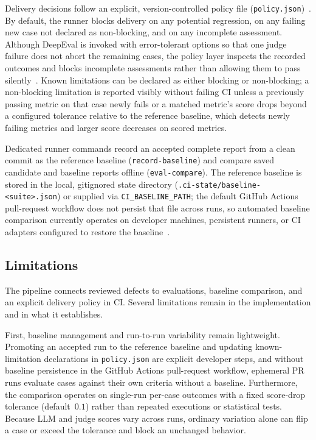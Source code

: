 Delivery decisions follow an explicit, version-controlled policy file
(\texttt{policy.json})~\parencite{Divination:Evaluations}. By default, the
runner blocks delivery on any potential regression, on any failing new case not
declared as non-blocking, and on any incomplete assessment. Although DeepEval
is invoked with error-tolerant options so that one judge failure does not abort
the remaining cases, the policy layer inspects the recorded outcomes and blocks
incomplete assessments rather than allowing them to pass
silently~\parencite{Divination:CI}. Known limitations can be declared as either
blocking or non-blocking; a non-blocking limitation is reported visibly without
failing CI unless a previously passing metric on that case newly fails or a
matched metric's score drops beyond a configured tolerance relative to the
reference baseline, which detects newly failing metrics and larger score
decreases on scored metrics.

Dedicated runner commands record an accepted complete report from a clean
commit as the reference baseline (\texttt{record-baseline}) and compare saved
candidate and baseline reports offline (\texttt{eval-compare}). The reference
baseline is stored in the local, gitignored state directory
(\texttt{.ci-state/baseline-\textless suite\textgreater.json}) or supplied via
\texttt{CI\_BASELINE\_PATH}; the default GitHub Actions pull-request workflow
does not persist that file across runs, so automated baseline comparison
currently operates on developer machines, persistent runners, or CI adapters
configured to restore the baseline~\parencite{Divination:CI}.

\subsection{Limitations}

The pipeline connects reviewed defects to evaluations, baseline comparison, and
an explicit delivery policy in CI. Several limitations remain in the
implementation and in what it establishes.

First, baseline management and run-to-run variability remain lightweight.
Promoting an accepted run to the reference baseline and updating
known-limitation declarations in \texttt{policy.json} are explicit developer
steps, and without baseline persistence in the GitHub Actions pull-request
workflow, ephemeral PR runs evaluate cases against their own criteria without a
baseline. Furthermore, the comparison operates on single-run per-case outcomes
with a fixed score-drop tolerance (default~$0.1$) rather than repeated
executions or statistical tests. Because LLM and judge scores vary across runs,
ordinary variation alone can flip a case or exceed the tolerance and block an
unchanged behavior.

